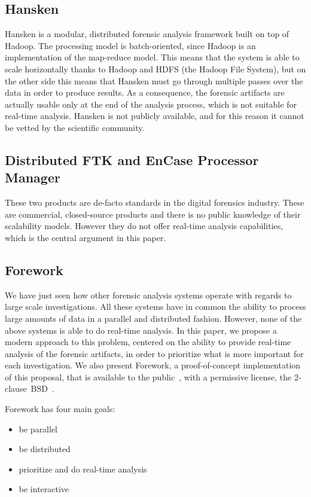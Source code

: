 \documentclass[twoside]{article}
\begin{document}
\begin{multicols}{2}
    \subsection*{Hansken}
    Hansken is a modular, distributed forensic analysis framework built on top
    of Hadoop. The processing model is batch-oriented, since Hadoop is an
    implementation of the map-reduce model. This means that the system is able
    to scale
    horizontally thanks to Hadoop and HDFS (the Hadoop File System), but on the
    other side this means that Hansken must go through multiple passes over the
    data in order to produce results. As a consequence, the forensic artifacts
    are actually usable only at the end of the analysis process, which is not
    suitable for real-time analysis. Hansken is not publicly available, and for
    this reason it cannot be vetted by the scientific community.

    \subsection*{Distributed FTK and EnCase Processor Manager}
    These two products are de-facto standards in the digital forensics industry.
    These are commercial, closed-source products and there is no public knowledge
    of their scalability models. However they do not offer real-time analysis
    capabilities, which is the central argument in this paper.

    \subsection*{Forework}
    We have just seen how other forensic analysis systems operate with regards
    to large scale investigations. All these systems have in common the ability
    to process large amounts of data in a parallel and distributed fashion.
    However, none of the above systems is able to do real-time analysis. In this
    paper, we propose a modern approach to this problem, centered on the ability
    to provide real-time analysis of the forensic artifacts, in order to
    prioritize what is more important for each investigation.
    We also present Forework, a proof-of-concept implementation of this
    proposal, that is available to the public~\cite{forework}, with a permissive
    license, the 2-clause~BSD~\cite{bsdlicense}.

    Forework has four main goals:
    \begin{itemize}
        \item be parallel
        \item be distributed
        \item prioritize and do real-time analysis
        \item be interactive
    \end{itemize}


\end{multicols}
\end{document}
